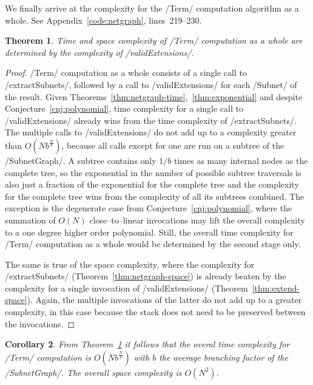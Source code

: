 \documentclass[12pt,a4paper]{article}
\newtheorem{theorem}{Theorem}
\newtheorem{corollary}[theorem]{Corollary}
\begin{document}
We finally arrive at the complexity for the \hs/Term/ computation algorithm as a whole. See Appendix~\ref{code:netgraph}, lines~219--230.
\begin{theorem}\label{thm:deciding-complexity}
    Time and space complexity of \hs/Term/ computation as a whole are determined by the complexity of \hs/validExtensions/.
\end{theorem}
\begin{proof}
    \hs/Term/ computation as a whole consists of a single call to \hs/extractSubnets/, followed by a call to \hs/validExtensions/ for each \hs/Subnet/ of the result. Given Theorems~\ref{thm:netgraph-time},~\ref{thm:exponential} and despite Conjecture~\ref{cnj:polynomial}, time complexity for a single call to \hs/validExtensions/ already wins from the time complexity of \hs/extractSubnets/. The multiple calls to \hs/validExtensions/ do not add up to a complexity greater than $O(Nb^{\frac{N}{b}})$, because all calls except for one are run on a subtree of the \hs/SubnetGraph/. A subtree contains only $1/b$ times as many internal nodes as the complete tree, so the exponential in the number of possible subtree traversals is also just a fraction of the exponential for the complete tree and the complexity for the complete tree wins from the complexity of all its subtrees combined. The exception is the degenerate case from Conjecture~\ref{cnj:polynomial}, where the summation of $O(N)$ close--to--linear invocations may lift the overall complexity to a one degree higher order polynomial. Still, the overall time complexity for \hs/Term/ computation as a whole would be determined by the second stage only.
    
    The same is true of the space complexity, where the complexity for \hs/extractSubnets/ (Theorem~\ref{thm:netgraph-space}) is already beaten by the complexity for a single invocation of \hs/validExtensions/ (Theorem~\ref{thm:extend-space}). Again, the multiple invocations of the latter do not add up to a greater complexity, in this case because the stack does not need to be preserved between the invocations.
\end{proof}

\begin{corollary}
    From Theorem~\ref{thm:deciding-complexity} it follows that the overal time complexity for \hs/Term/ computation is $O(Nb^{\frac{N}{b}})$ with $b$ the average branching factor of the \hs/SubnetGraph/. The overall space complexity is $O(N^2)$.
\end{corollary}
\end{document}

